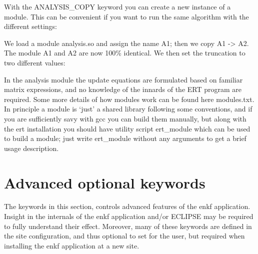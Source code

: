 \documentclass[letterpaper,10pt,english]{sphinxmanual}
\begin{document}
\label{\detokenize{keywords/index:analysis-copy}}
\begin{sphinxShadowBox}

With the ANALYSIS\_COPY keyword you can create a new instance of a module. This
can be convenient if you want to run the same algorithm with the different
settings:

%
\begin{sphinxVerbatim}[commandchars=\\\{\}]
     
    
\end{sphinxVerbatim}

We load a module analysis.so and assign the name A1; then we copy A1 -\textgreater{} A2.
The module A1 and A2 are now 100\% identical. We then set the truncation to two
different values:

%
\begin{sphinxVerbatim}[commandchars=\\\{\}]
   
   
\end{sphinxVerbatim}
\end{sphinxShadowBox}


In the analysis module the update equations are formulated based on familiar
matrix expressions, and no knowledge of the innards of the ERT program are
required. Some more details of how modules work can be found here modules.txt.
In principle a module is ‘just’ a shared library following some conventions, and
if you are sufficiently savy with gcc you can build them manually, but along
with the ert installation you should have utility script ert\_module which can be
used to build a module; just write ert\_module without any arguments to get a
brief usage description.


\section{Advanced optional keywords}
\label{\detokenize{keywords/index:advanced-optional-keywords}}\label{\detokenize{keywords/index:id11}}
The keywords in this section, controls advanced features of the enkf
application. Insight in the internals of the enkf application and/or ECLIPSE may
be required to fully understand their effect. Moreover, many of these keywords
are defined in the site configuration, and thus optional to set for the user,
but required when installing the enkf application at a new site.
\end{document}
